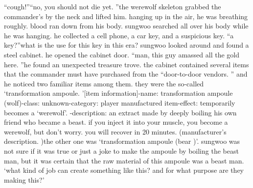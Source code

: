 “cough!”“no, you should not die yet.
”the werewolf skeleton grabbed the commander’s by the neck and lifted him.
hanging up in the air, he was breathing roughly.
 blood ran down from his body.
sungwoo searched all over his body while he was hanging.
 he collected a cell phone, a car key, and a suspicious key.
“a key?”what is the use for this key in this era? sungwoo looked around and found a steel cabinet.
he opened the cabinet door.
“man, this guy amassed all the gold here.
”he found an unexpected treasure trove.
the cabinet contained several items that the commander must have purchased from the “door-to-door vendors.
” and he noticed two familiar items among them.
 they were the so-called ‘transformation ampoule.
’[item information]-name: transformation ampoule (wolf)-class: unknown-category: player manufactured item-effect: temporarily becomes a ‘werewolf’.
-description: an extract made by deeply boiling his own friend who became a beast.
 if you inject it into your muscle, you become a werewolf, but don’t worry.
 you will recover in 20 minutes.
 (manufacturer’s description.
)the other one was ‘transformation ampoule (bear )’.
sungwoo was not sure if it was true or just a joke to make the ampoule by boiling the beast man, but it was certain that the raw material of this ampoule was a beast man.
‘what kind of job can create something like this? and for what purpose are they making this?’

 